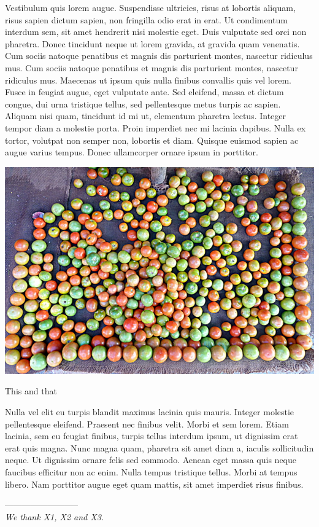\documentclass[a4paper,justified]{tufte-handout}
\begin{document}
Vestibulum quis lorem augue. Suspendisse ultricies, risus at lobortis aliquam, risus sapien dictum sapien, non fringilla odio erat in erat. Ut condimentum interdum sem, sit amet hendrerit nisi molestie eget. Duis vulputate sed orci non pharetra. Donec tincidunt neque ut lorem gravida, at gravida quam venenatis. Cum sociis natoque penatibus et magnis dis parturient montes, nascetur ridiculus mus. Cum sociis natoque penatibus et magnis dis parturient montes, nascetur ridiculus mus. Maecenas ut ipsum quis nulla finibus convallis quis vel lorem. Fusce in feugiat augue, eget vulputate ante. Sed eleifend, massa et dictum congue, dui urna tristique tellus, sed pellentesque metus turpis ac sapien. Aliquam nisi quam, tincidunt id mi ut, elementum pharetra lectus. Integer tempor diam a molestie porta. Proin imperdiet nec mi lacinia dapibus. Nulla ex tortor, volutpat non semper non, lobortis et diam. Quisque euismod sapien ac augue varius tempus. Donec ullamcorper ornare ipsum in porttitor.

\begin{marginfigure}
  \includegraphics[trim=0cm 0cm 0cm 0cm, clip=true]{./figures/tomatoes.jpg}
  \caption[Short version of title that appears in the list of figures]{This and that}
\end{marginfigure} 

Nulla vel elit eu turpis blandit maximus lacinia quis mauris. Integer molestie pellentesque eleifend. Praesent nec finibus velit. Morbi et sem lorem. Etiam lacinia, sem eu feugiat finibus, turpis tellus interdum ipsum, ut dignissim erat erat quis magna. Nunc magna quam, pharetra sit amet diam a, iaculis sollicitudin neque. Ut dignissim ornare felis sed commodo. Aenean eget massa quis neque faucibus efficitur non ac enim. Nulla tempus tristique tellus. Morbi at tempus libero. Nam porttitor augue eget quam mattis, sit amet imperdiet risus finibus.
 

\vspace{1cm}
--------------------------\\
\textit{We thank X1, X2 and X3.}
\end{document}
